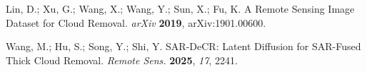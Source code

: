 Lin, D.; Xu, G.; Wang, X.; Wang, Y.; Sun, X.; Fu, K. A Remote Sensing Image Dataset for Cloud Removal. {\em arXiv} {\bf 2019}, arXiv:1901.00600.

Wang, M.; Hu, S.; Song, Y.; Shi, Y. SAR-DeCR: Latent Diffusion for SAR-Fused Thick Cloud Removal. {\em Remote Sens.} {\bf 2025}, {\em 17}, 2241.

